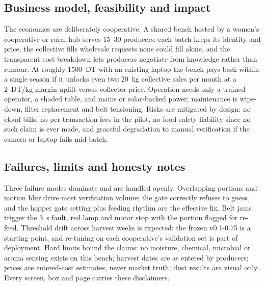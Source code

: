 \documentclass[10pt,conference,a4paper]{IEEEtran}
\begin{document}
\subsection{Business model, feasibility and impact}
The economics are deliberately cooperative. A shared bench hosted by a women's cooperative or rural hub serves 15--30 producers: each batch keeps its identity and price, the collective fills wholesale requests none could fill alone, and the transparent cost breakdown lets producers negotiate from knowledge rather than rumour. At roughly 1500~DT with an existing laptop the bench pays back within a single season if it unlocks even two 20~kg collective sales per month at a 2~DT/kg margin uplift versus collector price. Operation needs only a trained operator, a shaded table, and mains or solar-backed power; maintenance is wipe-down, filter replacement and belt tensioning. Risks are mitigated by design: no cloud bills, no per-transaction fees in the pilot, no food-safety liability since no such claim is ever made, and graceful degradation to manual verification if the camera or laptop fails mid-batch.
\subsection{Failures, limits and honesty notes}
Three failure modes dominate and are handled openly. Overlapping portions and motion blur drive most verification volume; the gate correctly refuses to guess, and the hopper gate setting plus feeding rhythm are the effective fix. Belt jams trigger the 3~s fault, red lamp and motor stop with the portion flagged for re-feed. Threshold drift across harvest weeks is expected: the frozen v0.1-0.75 is a starting point, and re-tuning on each cooperative's validation set is part of deployment. Hard limits bound the claims: no moisture, chemical, microbial or aroma sensing exists on this bench; harvest dates are as entered by producers; prices are entered-cost estimates, never market truth; dust results are visual only. Every screen, box and page carries these disclaimers.
\end{document}
